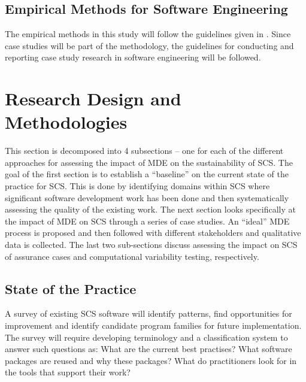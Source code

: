 \documentclass[12pt]{article}
\begin{document}
\subsection{Empirical Methods for Software Engineering} \label{SecEmpirical}

The empirical methods in this study will follow the guidelines given in
\citet{KitchenhamEtAl2002}.  Since case studies will be part of the methodology,
the guidelines for conducting and reporting case study research in software
engineering \citep{RunesonAndHost2009} will be followed.

\section{Research Design and Methodologies} \label{SecMethodologies}

This section is decomposed into 4 subsections -- one for each of the different
approaches for assessing the impact of MDE on the sustainability of SCS.  The
goal of the first section is to establish a ``baseline'' on the current state of
the practice for SCS.  This is done by identifying domains within SCS where
significant software development work has been done and then systematically
assessing the quality of the existing work.  The next section looks specifically
at the impact of MDE on SCS through a series of case studies.  An ``ideal'' MDE
process is proposed and then followed with different stakeholders and
qualitative data is collected.  The last two sub-sections discuss assessing the
impact on SCS of assurance cases and computational variability testing,
respectively.

\subsection{State of the Practice} \label{SecStateOfThePractice}

A survey of existing SCS software will identify patterns, find opportunities for
improvement and identify candidate program families for future implementation.
The survey will require developing terminology and a classification system to
answer such questions as: What are the current best practises?  What software
packages are reused and why these packages?  What do practitioners look for in
the tools that support their work?
\end{document}
